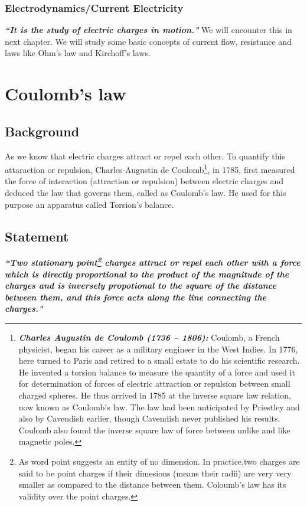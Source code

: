 \subsubsection{Electrodynamics/Current Electricity}
\textit{\textbf{
  ``It is the study of electric charges in motion."
}} We will encounter 
this in next chapter. We will study some basic concepts of current 
flow, resistance and laws like Ohm’s law and Kirchoff’s laws.

\section{Coulomb’s law}


\subsection*{Background}
As we know that electric charges attract or repel each other. To quantify
this attaraction or repulsion, Charles-Augustin de Coulomb\footnote{\textbf{\textit{Charles Augustin de Coulomb (1736 – 1806):}} Coulomb,
a French physicist, began his career as a military engineer in the West Indies.
In 1776, here turned to Paris and retired to a small estate to do his
scientific research. He invented a torsion balance to measure the
quantity of a force and used it for determination of forces of electric
attraction or repulsion between small charged spheres. He thus arrived in
1785 at the inverse square law relation, now known as Coulomb’s law. The
law had been anticipated by Priestley and also by Cavendish earlier,
though Cavendish
never published his results. Coulomb also found the
inverse square law of force between unlike and like magnetic poles.},
in 1785, first measured the force of interaction (attraction or repulsion) between 
electric charges and deduced the law that governs them, called as Coulomb’s law. He used 
for this purpose an apparatus called Torsion’s balance.


\subsection*{Statement}
\textit{
  \textbf{
    ``Two stationary point\footnote{As word point suggests an entity 
    of no dimension. In practice,two charges are said to be point 
    charges if their dimesions (means their radii) are very very smaller as compared to 
    the distance between them. Coloumb’s law
    has its validity over the point charges.} charges attract or repel each 
    other with a force which is directly proportional to the 
    product of the magnitude of the charges and is inversely 
    propotional to the square of the distance between them, and 
    this force acts along the line connecting the charges."
  }
}

